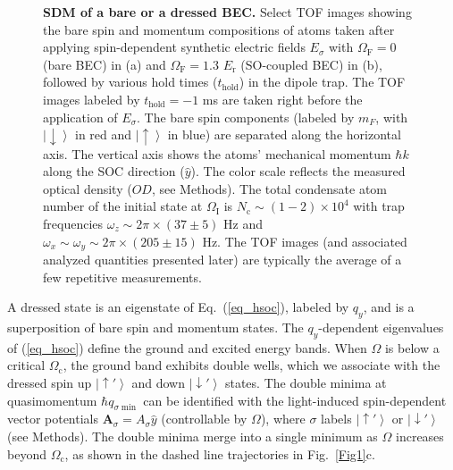 \documentclass[showpacs,preprintnumbers,amsmath,amssymb, superscriptaddress, aps, reprint]{revtex4-1}
\def\E_r{E_{\text{r}}}
\def\OmegaF{\Omega_{\text{F}}}
\def\OmegaI{\Omega_{\text{I}}}
\def\thold{t_{\text{hold}}}
\begin{document}
{\begin{figure}[!ht]
\caption{\textbf{SDM of a bare or a dressed BEC.} Select TOF images showing the bare spin and momentum compositions of atoms taken after applying spin-dependent synthetic electric fields $E_{\sigma}$ with $\OmegaF=0$ (bare BEC) in (a) and $\OmegaF= 1.3$ $\E_r$ (SO-coupled BEC) in (b), followed by various hold times ($\thold$) in the dipole trap. The TOF images labeled by $\thold=-1$ ms are taken right before the application of $E_{\sigma}$. The bare spin components (labeled by $m_F$, with $\left| \downarrow  \right\rangle$ in red and $\left| \uparrow  \right\rangle$ in blue) are separated along the horizontal axis. The vertical axis shows the atoms' mechanical momentum $\hbar k$ along the SOC direction ($\hat{y}$). The color scale reflects the measured optical density ($OD$, see Methods). The total condensate atom number of the initial state at $\OmegaI$ is $N_{\text{c}}\sim (1-2)\times{10^4}$ with trap frequencies $\omega_z\sim 2\pi \times (37\pm 5)$ Hz and $\omega_x\sim \omega_y \sim 2\pi\times(205\pm 15)$ Hz. The TOF images (and associated analyzed quantities presented later) are typically the average of a few repetitive measurements.}
\label{Fig2}
\end{figure}
A dressed state is an eigenstate of Eq.~(\ref{eq_hsoc}), labeled by $q_y$, and is a superposition of bare spin and momentum states. The $q_y$-dependent eigenvalues of (\ref{eq_hsoc}) define the ground and excited energy bands. When $\Omega$ is below a critical $\Omega_{\text{c}}$, the ground band exhibits double wells, which we associate with the dressed spin up $\left| { \uparrow '} \right\rangle $ and down $\left| { \downarrow '} \right\rangle $ states. 
The double minima at quasimomentum $\hbar q_{\sigma \min }$ can be identified with the light-induced spin-dependent vector potentials $\textbf{A}_{\sigma}=A_{\sigma}\hat{y}$ (controllable by $\Omega$), where $\sigma$ labels $\left| { \uparrow '} \right\rangle $ or $\left| { \downarrow '} \right\rangle $ \cite{Beeler_SHE_Nature_2013} (see Methods). 
The double minima merge into a single minimum as $\Omega$ increases beyond $\Omega_{\text{c}}$, as shown in the dashed line trajectories in Fig.~\ref{Fig1}c.



}
\end{document}
